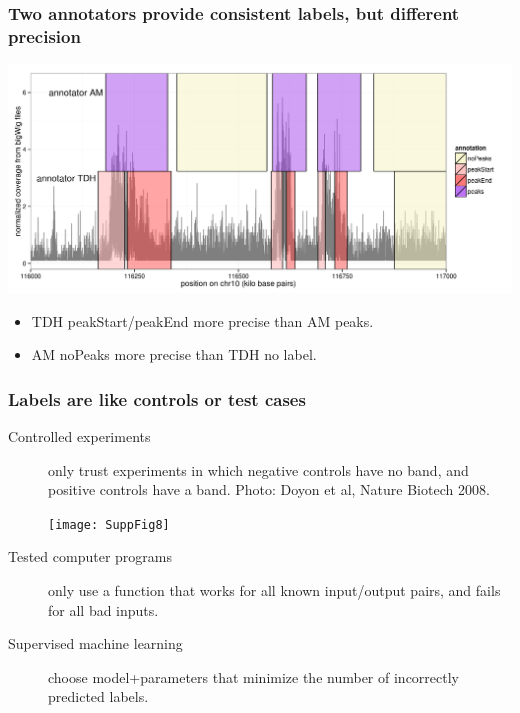 \documentclass{beamer}
\begin{document}
\begin{frame}
  \frametitle{Two annotators provide consistent labels, but different
    precision}
  \includegraphics[width=1.1\textwidth]{screenshot-several-annotators}

  \begin{itemize}
  \item TDH peakStart/peakEnd more precise than AM peaks.
  \item AM noPeaks more precise than TDH no label.
  \end{itemize}
\end{frame}

\begin{frame}
  \frametitle{Labels are like controls or test cases}
  \begin{description}
  \item[Controlled experiments] only trust experiments in
    which negative controls have no band, and positive controls have a
    band. Photo: Doyon et al, Nature Biotech 2008.

    \texttt{[image: SuppFig8]}

  \item[Tested computer programs] only use a function that works for
    all known input/output pairs, and fails for all bad inputs.

  \item[Supervised machine learning] choose model+parameters that minimize the
    number of incorrectly predicted labels.
  \end{description}
\end{frame}
\end{document}
